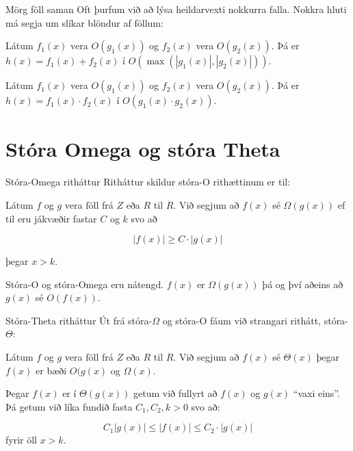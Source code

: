 \documentclass[handout]{beamer}
\begin{document}
\begin{frame}{Mörg föll saman}
Oft þurfum við að lýsa heildarvexti nokkurra falla. Nokkra hluti má segja um slíkar blöndur af föllum:
\begin{tcolorbox}[title=Samlagning falla]
Látum $f_1(x)$ vera $O(g_1(x))$ og $f_2(x)$ vera $O(g_2(x))$. Þá er $h(x) = f_1(x) + f_2(x)$ í $O(\max(|g_1(x)|, |g_2(x)|))$.
\end{tcolorbox}
\begin{tcolorbox}[title=Margföldun falla]
Látum $f_1(x)$ vera $O(g_1(x))$ og $f_2(x)$ vera $O(g_2(x))$. Þá er $h(x) = f_1(x) \cdot f_2(x)$ í $O(g_1(x)\cdot g_2(x))$.
\end{tcolorbox}

\end{frame}

\section{Stóra Omega og stóra Theta}

\begin{frame}{Stóra-Omega ritháttur}
Ritháttur skildur stóra-O rithættinum er til:

\begin{tcolorbox}[title=$\Omega$ ritháttur]
Látum $f$ og $g$ vera föll frá $Z$ eða $R$ til $R$. Við segjum að $f(x)$ sé $\Omega(g(x))$ ef til eru jákvæðir fastar $C$ og $k$ svo að

\[
 |f(x)| \geq C \cdot |g(x)|
\]

þegar $x > k$.
\end{tcolorbox}
\pause
Stóra-O og stóra-Omega eru nátengd. $f(x)$ er $\Omega(g(x))$ þá og því aðeins að $g(x)$ sé $O(f(x))$.
\end{frame}

\begin{frame}{Stóra-Theta ritháttur}
Út frá stóra-$\Omega$ og stóra-O fáum við strangari rithátt, stóra-$\Theta$:

\begin{tcolorbox}[title=$\Theta$ ritháttur]
Látum $f$ og $g$ vera föll frá $Z$ eða $R$ til $R$. Við segjum að $f(x)$ sé $\Theta(x)$ þegar $f(x)$ er bæði $O(g(x)$ og $\Omega(x)$.
\end{tcolorbox}
Þegar $f(x)$ er í $\Theta(g(x))$ getum við fullyrt að $f(x)$ og $g(x)$ ``vaxi eins''. Þá getum við líka fundið fasta $C_1, C_2, k > 0$ svo að:

\[
 C_1|g(x)| \leq |f(x)| \leq C_2 \cdot |g(x)|
\]
fyrir öll $x > k$.
\end{frame}
\end{document}
